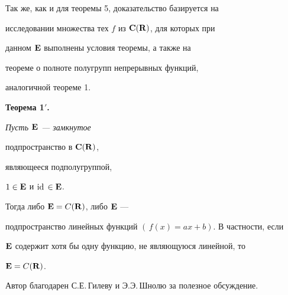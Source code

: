 \medskip





Так же, как и для теоремы 5, доказательство базируется на


исследовании множества тех $f$ из ${\bold C}({\bold R})$, для которых при


данном ${\bold E}$ выполнены условия теоремы, а также на


теореме о полноте полугрупп непрерывных функций,


аналогичной теореме 1.


\medskip





{\bf Теорема 1$'$.} {\it Пусть ${\bold E}$ --- замкнутое


подпространство в ${\bold C}({\bold R})$,


являющееся подполугруппой,


$1 \in {\bold E}$ и $\text{id}\,\in {\bold E}$.


Тогда либо ${\bold E=C}({\bold R})$, либо ${\bold E}$ ---


подпространство линейных функций $(\,f(x)=ax+b)$. В частности, если


${\bold E}$ содержит хотя бы одну функцию, не являющуюся линейной, то


${\bold E=C}({\bold R})$.}


\medskip





Автор благодарен С.Е.\,Гилеву и Э.Э.\,Шнолю за полезное обсуждение.








